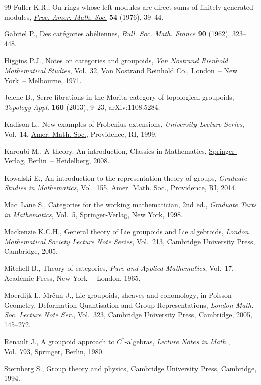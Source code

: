 \documentclass[11pt]{article}
\numberwithin{equation}{section}
\begin{document}
\begin{thebibliography}{99}
Fuller K.R., On rings whose left modules are direct sums of finitely generated
 modules, \href{https://doi.org/10.2307/2040744}{\textit{Proc. Amer. Math. Soc.}} \textbf{54} (1976), 39--44.

Gabriel P., Des cat\'{e}gories ab\'{e}liennes, \href{https://doi.org/10.24033/bsmf.1583}{\textit{Bull. Soc. Math. France}}
 \textbf{90} (1962), 323--448.

Higgins P.J., Notes on categories and groupoids, \textit{Van Nostrand Rienhold
 Mathematical Studies}, Vol.~32, Van Nostrand Reinhold Co., London~-- New
 York~-- Melbourne, 1971.

Jelenc B., Serre fibrations in the {M}orita category of topological groupoids,
 \href{https://doi.org/10.1016/j.topol.2012.09.013}{\textit{Topology Appl.}} \textbf{160} (2013), 9--23, \href{https://arxiv.org/abs/1108.5284}{arXiv:1108.5284}.

Kadison L., New examples of {F}robenius extensions, \textit{University Lecture
 Series}, Vol.~14, \href{https://doi.org/10.1090/ulect/014}{Amer. Math. Soc.}, Providence, RI, 1999.

Karoubi M., {$K$}-theory. An introduction, Classics in Mathematics,
 \href{https://doi.org/10.1007/978-3-540-79890-3}{Springer-Verlag}, Berlin~-- Heidelberg, 2008.

Kowalski E., An introduction to the representation theory of groups,
 \textit{Graduate Studies in Mathematics}, Vol.~155, Amer. Math. Soc.,
 Providence, RI, 2014.

Mac~Lane S., Categories for the working mathematician, 2nd ed., \textit{Graduate Texts
 in Mathematics}, Vol.~5, \href{https://doi.org/10.1007/978-1-4757-4721-8}{Springer-Verlag}, New York, 1998.

Mackenzie K.C.H., General theory of {L}ie groupoids and {L}ie algebroids,
 \textit{London Mathematical Society Lecture Note Series}, Vol.~213, \href{https://doi.org/10.1017/CBO9781107325883}{Cambridge
 University Press}, Cambridge, 2005.

Mitchell B., Theory of categories, \textit{Pure and Applied Mathematics},
 Vol.~17, Academic Press, New York~-- London, 1965.

Moerdijk I., Mr\v{c}un J., Lie groupoids, sheaves and cohomology, in Poisson
 Geometry, Deformation Quan\-ti\-sation and Group Representations, \textit{London
 Math. Soc. Lecture Note Ser.}, Vol.~323, \href{https://doi.org/10.1017/CBO9780511734878}{Cambridge University Press},
 Cambridge, 2005, 145--272.

Renault J., A groupoid approach to {$C^{\ast} $}-algebras, \textit{Lecture
 Notes in Math.}, Vol.~793, \href{https://doi.org/10.1007/BFb0091072}{Springer}, Berlin, 1980.

Sternberg S., Group theory and physics, Cambridge University Press, Cambridge, 1994.

\end{thebibliography}
\end{document}
